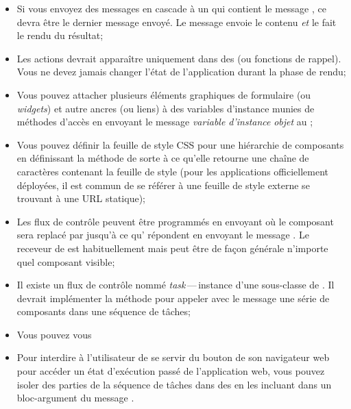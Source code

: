 \documentclass[a4paper,10pt,twoside]{book}
\begin{document}
\begin{itemize}
  \item Si vous envoyez des messages en cascade à un \brush qui
    contient le message , ce  devra être le
    dernier message envoyé.
Le message  envoie le contenu \emph{et} le fait le rendu du résultat;
  \item Les actions devrait apparaître uniquement dans des \callbacks
    (ou fonctions de rappel).
Vous ne devez jamais changer l'état de l'application durant la phase de rendu;
  \item Vous pouvez attacher plusieurs éléments graphiques de
    formulaire (ou \emph{widgets}) et autre ancres (ou liens) à des
    variables d'instance munies de méthodes d'accès en envoyant le
    message  \emph{variable d'instance}  \emph{objet}
    au \brush;
  \item Vous pouvez définir la feuille de style CSS pour une
    hiérarchie de composants en définissant la méthode  de
    sorte à ce qu'elle retourne une chaîne de caractères contenant la
    feuille de style (pour les applications officiellement déployées,
    il est commun de se référer à une feuille de style externe se
    trouvant à une URL statique);
  \item Les flux de contrôle
peuvent être programmés en envoyant  où le composant
 sera replacé par  jusqu'à ce qu' répondent en
envoyant le message  .
Le receveur de  est habituellement  mais peut être
de façon générale n'importe quel composant visible;
  \item Il existe un flux de contrôle
nommé \emph{task}\,---\,instance d'une sous-classe de . Il
devrait implémenter la méthode  pour appeler avec le message
 une série de composants dans une séquence de tâches;
  \item Vous pouvez vous 
  \item Pour interdire à l'utilisateur de se servir du bouton \backbtn
    de son navigateur web pour accéder un état d'exécution passé de
    l'application web, vous pouvez isoler des parties de la séquence
    de tâches dans des \transactions en les incluant dans un
    bloc-argument du message .
\end{itemize}

\ifx\wholebook\relax\else 
   
   
\end{document}
